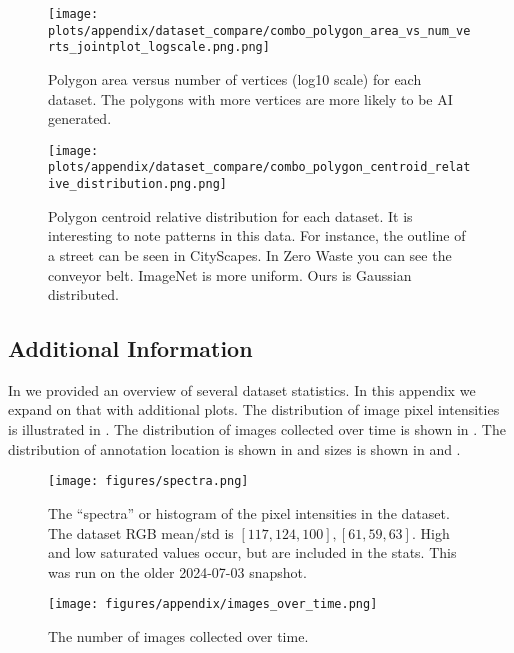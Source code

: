 \begin{figure*}[ht]
\centering
\texttt{[image: plots/appendix/dataset\_compare/combo\_polygon\_area\_vs\_num\_verts\_jointplot\_logscale.png.png]}
\caption[]{
    Polygon area versus number of vertices (log10 scale) for each dataset.
    The polygons with more vertices are more likely to be AI generated.
}
\label{fig:combo_polygon_area_vs_num_verts_jointplot}
\end{figure*}

\begin{figure*}[ht]
\centering
\texttt{[image: plots/appendix/dataset\_compare/combo\_polygon\_centroid\_relative\_distribution.png.png]}
\caption[]{
    Polygon centroid relative distribution for each dataset. It is interesting
    to note patterns in this data. For instance, the outline of a street can be
    seen in CityScapes. In Zero Waste you can see the conveyor belt. ImageNet
    is more uniform. Ours is Gaussian distributed. 
}
\label{fig:combo_polygon_centroid_relative_distribution}
\end{figure*}

\FloatBarrier


\subsection{Additional Information}
\label{sec:expanded_dataset}

In  we provided an overview of several dataset statistics.
In this appendix we expand on that with additional plots.
The distribution of image pixel intensities is illustrated in .
The distribution of images collected over time is shown in .
The distribution of annotation location is shown in  and sizes is shown
  in  and .


\begin{figure*}[ht]
\centering
\texttt{[image: figures/spectra.png]}
\caption[]{
    The ``spectra'' or histogram of the pixel intensities in the dataset. 
    The dataset RGB mean/std is $[117, 124, 100], [61, 59, 63]$. 
    High and low saturated values occur, but are included in the stats.
    This was run on the older 2024-07-03 snapshot.
}
\label{fig:spectra}
\end{figure*}


\begin{figure*}[ht]
\centering
\texttt{[image: figures/appendix/images\_over\_time.png]}
\caption[]{
    The number of images collected over time.
}
\label{fig:images_over_time}
\end{figure*}


